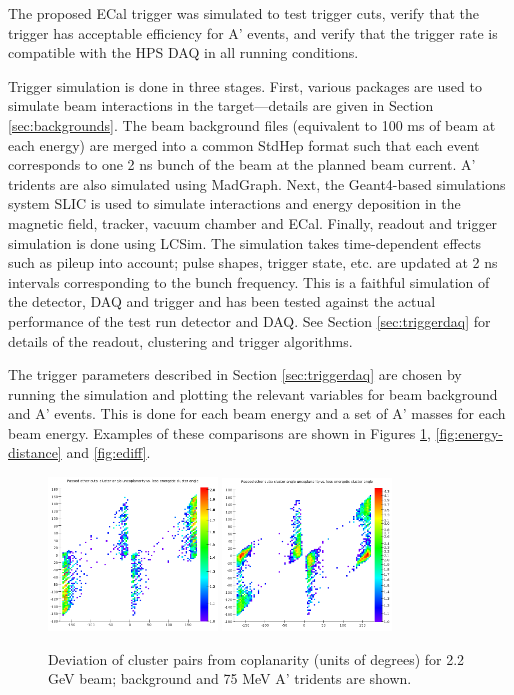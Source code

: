 
The proposed ECal trigger was simulated to test trigger cuts, verify that the trigger has acceptable efficiency for A' events, and verify that the trigger rate is compatible with the HPS DAQ in all running conditions.

Trigger simulation is done in three stages. 
First, various packages are used to simulate beam interactions in the target---details are given in Section \ref{sec:backgrounds}.
The beam background files (equivalent to 100 ms of beam at each energy) are merged into a common StdHep format such that each event corresponds to one 2 ns bunch of the beam at the planned beam current.
A' tridents are also simulated using MadGraph. 
Next, the Geant4-based simulations system SLIC \cite{slic} is used to simulate interactions and energy deposition in the magnetic field, tracker, vacuum chamber and ECal. 
Finally, readout and trigger simulation is done using LCSim. The simulation takes time-dependent effects such as pileup into account; pulse shapes, trigger state, etc. are updated at 2 ns intervals corresponding to the bunch frequency.
This is a faithful simulation of the detector, DAQ and trigger and has been tested against the actual performance of the test run detector and DAQ. See Section \ref{sec:triggerdaq} for details of the readout, clustering and trigger algorithms.

The trigger parameters described in Section \ref{sec:triggerdaq} are chosen by running the simulation and plotting the relevant variables for beam background and A' events. 
This is done for each beam energy and a set of A' masses for each beam energy. Examples of these comparisons are shown in Figures \ref{fig:coplanarity}, \ref{fig:energy-distance} and \ref{fig:ediff}.

\begin{figure}[ht]
	\includegraphics[width=0.4\textwidth]{performance/trigger/coplanarity_22}
	\includegraphics[width=0.4\textwidth]{performance/trigger/coplanarity_22_075mev}
	\caption{\small{Deviation of cluster pairs from coplanarity (units of degrees) for 2.2 GeV beam; background and 75 MeV A' tridents are shown.}}
	\label{fig:coplanarity}
\end{figure}

